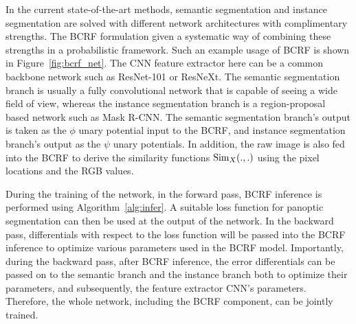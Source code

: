 In the current state-of-the-art methods, semantic segmentation and instance segmentation are solved with different network architectures with complimentary strengths. The BCRF formulation given a systematic way of combining these strengths in a probabilistic framework. Such an example usage of BCRF is shown in Figure~\ref{fig:bcrf_net}. The CNN feature extractor here can be a common backbone network such as ResNet-101 or ResNeXt. The semantic segmentation branch is usually a fully convolutional network that is capable of seeing a wide field of view, whereas the instance segmentation branch is a region-proposal based network such as Mask R-CNN. The semantic segmentation branch's output is taken as the $\phi$ unary potential input to the BCRF, and instance segmentation branch's output as the $\psi$ unary potentials. In addition, the raw image is also fed into the BCRF to derive the similarity functions $\operatorname{Sim}_X(., .)$ using the pixel locations and the RGB values. 

During the training of the network, in the forward pass, BCRF inference is performed using Algorithm~\ref{alg:infer}. A suitable loss function for panoptic segmentation can then be used at the output of the network. In the backward pass, differentials with respect to the loss function will be passed into the BCRF inference to optimize various parameters used in the BCRF model. Importantly, during the backward pass, after BCRF inference, the error differentials can be passed on to the semantic branch and the instance branch both to optimize their parameters, and subsequently, the feature extractor CNN's parameters. Therefore, the whole network, including the BCRF component, can be jointly trained.


